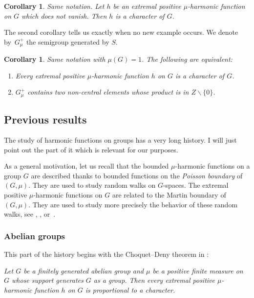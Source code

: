 \documentclass[11pt]{article}
\numberwithin{equation}{section}
\newenvironment{enumeratei}
{\bgroup\def\theenumi{\roman{enumi}}\def\theenumii{\arabic{enumii}}\begin{enumerate}}
{\end{enumerate}\egroup}
\newtheorem{Cor}[Thm]{Corollary}
\theoremstyle{definition}
\let\bq\relax
\let\eq\relax
\begin{document}
\begin{Cor}
\label{corharmu1}
Same notation.
Let $h$ be an extremal positive $\mu$-harmonic function
on $G$ which does not vanish. Then $h$ is a character of $G$.
\end{Cor}

The second corollary tells us exactly when no new example occurs.
We denote by~$G_\mu^+$ the semigroup generated by $S$.

\begin{Cor}
\label{corharmu2}
Same notation with $\mu(G)=1$.
The following are equivalent:
\begin{enumeratei}
\item\label{corharmu2i}
Every extremal positive $\mu$-harmonic function $h$ on $G$ is
a character of $G$.
\item\label{corharmu2ii}
$G_\mu^+$ contains two non-central elements whose product is in
$Z\smallsetminus \{0\}$.
\end{enumeratei}
\end{Cor}

\subsection{Previous results}
\label{secpreres}
\bq
The study of harmonic functions on groups has a very long history. I will just point out the part of it which is relevant
for our purposes.
\eq

As a general motivation, let us recall that
the bounded $\mu$-harmonic functions on a group $G$
are described thanks
to bounded functions on the \emph{Poisson boundary} of $(G,\mu)$.
They are used to study
random walks on $G$-spaces.
The extremal positive $\mu$\nobreakdash-harmonic functions on $G$
are related to the Martin boundary of $(G,\mu)$.
They are used to study
more precisely the behavior of these random walks,
see \cite{Ancona90}, \cite{Gouezel15}, \cite{Sawyer97} or~\cite{Woess00}.

\subsubsection{Abelian groups}
This part of the history begins with the Choquet--Deny theorem
in \cite{ChoquetDeny60}:

\emph{Let $G$ be a finitely generated abelian group and
$\mu$ be a
positive finite measure on~$G$
whose support generates $G$ as a group.
Then every extremal positive $\mu$-harmonic function
$h$ on $G$ is proportional to a character.}
\end{document}
